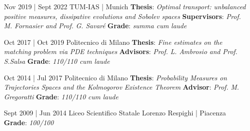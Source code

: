 \begin{eyenumerate}
   \item {}
   {Nov 2019 | Sept 2022}
   {TUM-IAS | Munich}
   {\textbf{Thesis}: \textit{Optimal transport: unbalanced positive measures, dissipative evolutions and Sobolev spaces}}
   {\textbf{Supervisors}: \textit{Prof. M. Fornasier and Prof. G. Savar\'e}}
   {\textbf{Grade}: \textit{summa cum laude}}
   
   
   \item {}
   {Oct 2017 | Oct 2019}
   {Politecnico di Milano}
   {\textbf{Thesis}: \textit{Fine estimates on the matching problem via PDE techniques}}
   {\textbf{Advisors}: \textit{Prof. L. Ambrosio and Prof. S.Salsa}}
   {\textbf{Grade}: \textit{110/110 cum laude}}
   
   \item {}
   {Oct 2014 | Jul 2017}
   {Politecnico di Milano}
   {\textbf{Thesis}: \textit{Probability Measures on Trajectories Spaces and the Kolmogorov Existence Theorem}}
   {\textbf{Advisor}: \textit{Prof. M. Gregoratti}}
   {\textbf{Grade}: \textit{110/110 cum laude}}
   \item {}
   {Sept 2009 | Jun 2014}
   {Liceo Scientifico Statale Lorenzo Respighi | Piacenza}
   {\textbf{Grade}: \textit{100/100}}
\end{eyenumerate}

